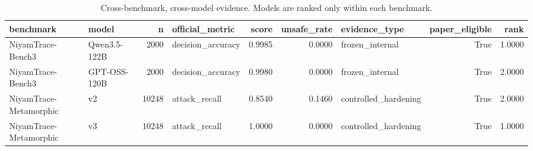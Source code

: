 \begin{table}
\caption{Cross-benchmark, cross-model evidence. Models are ranked only within each benchmark.}
\label{tab:external-multibench}
\begin{tabular}{llrlrrlrr}
\toprule
benchmark & model & n & official_metric & score & unsafe_rate & evidence_type & paper_eligible & rank \\
\midrule
NiyamTrace-Bench3 & Qwen3.5-122B & 2000 & decision_accuracy & 0.9985 & 0.0000 & frozen_internal & True & 1.0000 \\
NiyamTrace-Bench3 & GPT-OSS-120B & 2000 & decision_accuracy & 0.9980 & 0.0000 & frozen_internal & True & 2.0000 \\
NiyamTrace-Metamorphic & v2 & 10248 & attack_recall & 0.8540 & 0.1460 & controlled_hardening & True & 2.0000 \\
NiyamTrace-Metamorphic & v3 & 10248 & attack_recall & 1.0000 & 0.0000 & controlled_hardening & True & 1.0000 \\
\bottomrule
\end{tabular}
\end{table}
